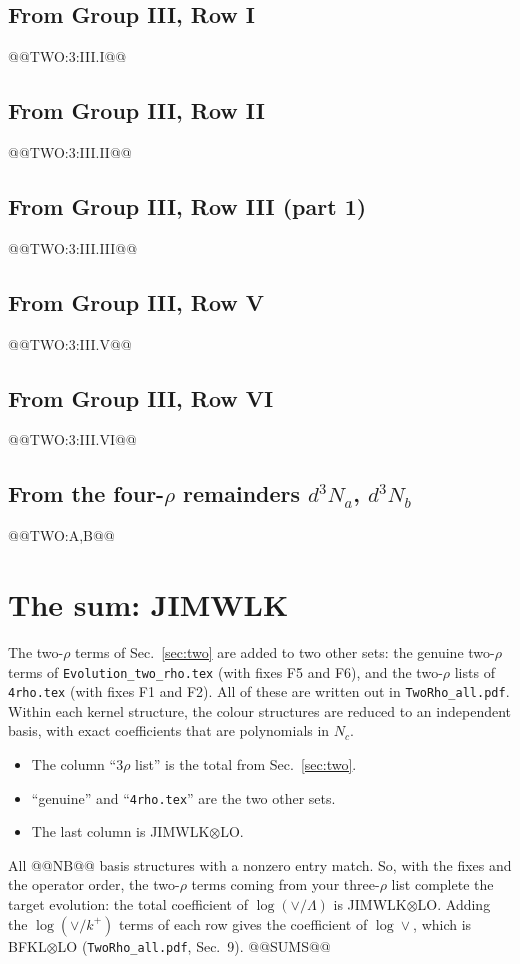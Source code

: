 \documentclass[10pt]{article}
\numberwithin{equation}{section}
\begin{document}
\subsection{From Group III, Row I}
@@TWO:3:III.I@@
\subsection{From Group III, Row II}
@@TWO:3:III.II@@
\subsection{From Group III, Row III (part 1)}
@@TWO:3:III.III@@
\subsection{From Group III, Row V}
@@TWO:3:III.V@@
\subsection{From Group III, Row VI}
@@TWO:3:III.VI@@
\subsection{From the four-\texorpdfstring{$\rho$}{rho} remainders \texorpdfstring{$d^3N_a$, $d^3N_b$}{a, b}}
@@TWO:A,B@@

\section{The sum: JIMWLK}\label{sec:sum}
The two-$\rho$ terms of Sec.~\ref{sec:two} are added to two other sets: the genuine two-$\rho$ terms of \texttt{Evolution\_two\_rho.tex} (with fixes F5 and F6), and the two-$\rho$ lists of \texttt{4rho.tex} (with fixes F1 and F2). All of these are written out in \texttt{TwoRho\_all.pdf}. Within each kernel structure, the colour structures are reduced to an independent basis, with exact coefficients that are polynomials in $N_c$.
\begin{itemize}
\item The column ``3$\rho$ list'' is the total from Sec.~\ref{sec:two}.
\item ``genuine'' and ``\texttt{4rho.tex}'' are the two other sets.
\item The last column is JIMWLK$\otimes$LO.
\end{itemize}
All @@NB@@ basis structures with a nonzero entry match. So, with the fixes and the operator order, the two-$\rho$ terms coming from your three-$\rho$ list complete the target evolution: the total coefficient of $\log(\vee/\Lambda)$ is JIMWLK$\otimes$LO. Adding the $\log(\vee/k^+)$ terms of each row gives the coefficient of $\log\vee$, which is BFKL$\otimes$LO (\texttt{TwoRho\_all.pdf}, Sec.~9).
@@SUMS@@
\end{document}
